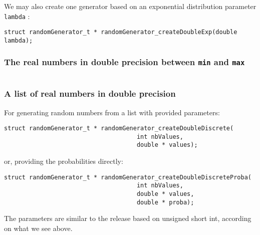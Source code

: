    We may also create one generator based on an exponential distribution
parameter {\tt lambda} :

\begin{verbatim}
struct randomGenerator_t * randomGenerator_createDoubleExp(double lambda);
\end{verbatim}

%
\subsubsection{The real numbers in double precision between {\tt min} and {\tt max}}

\begin{verbatim}
\end{verbatim}

%
\subsubsection{A list of real numbers in double precision}

   For generating random numbers from a list with provided
parameters:

\begin{verbatim}
struct randomGenerator_t * randomGenerator_createDoubleDiscrete(
                                     int nbValues,
                                     double * values);
\end{verbatim}

   or, providing the probabilities directly:

\begin{verbatim}
struct randomGenerator_t * randomGenerator_createDoubleDiscreteProba(
                                     int nbValues,
                                     double * values,
                                     double * proba);
\end{verbatim}

   The parameters are similar to the release based on unsigned short 
int, according on what we see above.

%
